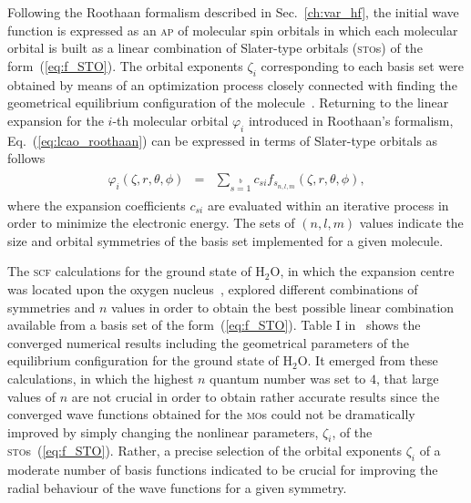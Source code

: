 Following the Roothaan formalism described in Sec.~\ref{ch:var_hf},
the initial wave function is expressed as an \textsc{ap} of molecular
spin orbitals in which each molecular orbital is built as a linear
combination of Slater-type orbitals (\textsc{sto}s) of the
form~(\ref{eq:f_STO}). The orbital exponents $\zeta_{i}$ corresponding
to each basis set were obtained by means of an optimization process
closely connected with finding the geometrical equilibrium
configuration of the
molecule~\cite{Moccia_JCP_2164,Moccia_1964}. Returning to the linear
expansion for the $i$-th molecular orbital $\varphi_{i}$ introduced in
Roothaan's formalism, Eq.~(\ref{eq:lcao_roothaan}) can be expressed in
terms of Slater-type orbitals as follows
%
\begin{eqnarray}
  \begin{split}
    \varphi_{i}(\zeta,r,\theta,\phi) & = &
    \sum\limits_{s=1}\limits^{b} c_{si} f_{s_{n,l,m}}(\zeta,r,\theta,\phi),
  \end{split}
  \label{eq:STO_expansion}
\end{eqnarray}
%
where the expansion coefficients $c_{si}$ are evaluated within an
iterative process in order to minimize the electronic energy. The sets
of $(n,l,m)$ values indicate the size and orbital symmetries of the
basis set implemented for a given molecule.

The \textsc{scf} calculations for the ground state of H$_{2}$O, in
which the expansion centre was located upon the oxygen
nucleus~\cite{Moccia_1964}, explored different combinations of
symmetries and $n$ values in order to obtain the best possible linear
combination available from a basis set of the
form~(\ref{eq:f_STO}). Table I in~\cite{Moccia_1964} shows the
converged numerical results including the geometrical parameters of
the equilibrium configuration for the ground state of H$_{2}$O. It
emerged from these calculations, in which the highest $n$ quantum
number was set to $4$, that large values of $n$ are not crucial in
order to obtain rather accurate results since the converged wave
functions obtained for the \textsc{mo}s could not be dramatically
improved by simply changing the nonlinear parameters, $\zeta_{i}$, of
the \textsc{sto}s~(\ref{eq:f_STO}). Rather, a precise selection of the
orbital exponents $\zeta_{i}$ of a moderate number of basis functions
indicated to be crucial for improving the radial behaviour of the wave
functions for a given symmetry.

